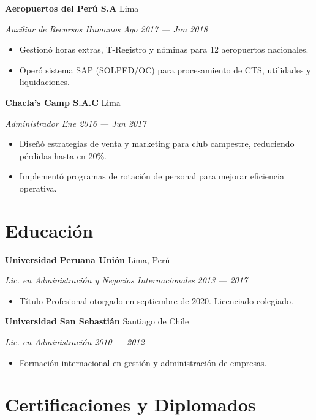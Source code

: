 \documentclass[11pt,letterpaper]{article}
\newcommand{\entry}[4]{%
  \noindent\textbf{#1} \hfill #2 \par\nopagebreak
  \textit{#3} \hfill \textit{#4} \par\nopagebreak
}
\begin{document}
\entry{Aeropuertos del Per\'u S.A}{Lima}{Auxiliar de Recursos Humanos}{Ago 2017 --- Jun 2018}
\begin{itemize}
  \item Gestion\'o horas extras, T-Registro y n\'ominas para 12 aeropuertos nacionales.
  \item Oper\'o sistema SAP (SOLPED/OC) para procesamiento de CTS, utilidades y liquidaciones.
\end{itemize}
\vspace{0.3em}

\entry{Chacla's Camp S.A.C}{Lima}{Administrador}{Ene 2016 --- Jun 2017}
\begin{itemize}
  \item Dise\~n\'o estrategias de venta y marketing para club campestre, reduciendo p\'erdidas hasta en 20\%.
  \item Implement\'o programas de rotaci\'on de personal para mejorar eficiencia operativa.
\end{itemize}
\vspace{0.3em}

\section{Educaci\'on}

\entry{Universidad Peruana Uni\'on}{Lima, Per\'u}{Lic. en Administraci\'on y Negocios Internacionales}{2013 --- 2017}
\begin{itemize}
  \item T\'itulo Profesional otorgado en septiembre de 2020. Licenciado colegiado.
\end{itemize}
\vspace{0.3em}

\entry{Universidad San Sebasti\'an}{Santiago de Chile}{Lic. en Administraci\'on}{2010 --- 2012}
\begin{itemize}
  \item Formaci\'on internacional en gesti\'on y administraci\'on de empresas.
\end{itemize}
\vspace{0.3em}

\section{Certificaciones y Diplomados}
\end{document}
